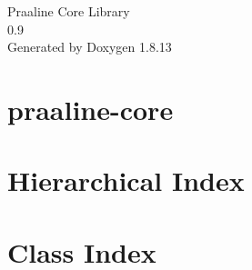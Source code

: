 \documentclass[twoside]{book}
\newcommand{\+}{\discretionary{\mbox{\scriptsize$\hookleftarrow$}}{}{}}
\newcommand{\clearemptydoublepage}{%
  \newpage{\pagestyle{empty}\cleardoublepage}%
}
\begin{document}
\hypersetup{pageanchor=false,
             bookmarksnumbered=true,
             pdfencoding=unicode
            }
\begin{titlepage}
\vspace*{7cm}
\begin{center}%
{\Large Praaline Core Library \\[1ex]\large 0.\+9 }\\
\vspace*{1cm}
{\large Generated by Doxygen 1.8.13}\\
\end{center}
\end{titlepage}
\clearemptydoublepage
{}
\tableofcontents
\clearemptydoublepage
{}
\hypersetup{pageanchor=true}

\chapter{praaline-\/core}
\label{md__home_george__develop__praaline_py_praaline-core__r_e_a_d_m_e}

\chapter{Hierarchical Index}

\chapter{Class Index}

\end{document}
